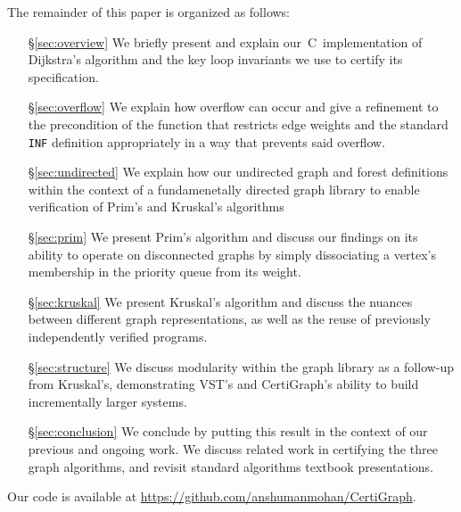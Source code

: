 The remainder of this paper is organized as follows:
\begin{itemize}
    \item[\S\ref{sec:overview}] We briefly present and explain
    our~C~implementation of Dijkstra's algorithm and the key loop invariants
    we use to certify its specification.
    \item[\S\ref{sec:overflow}] We explain how overflow can occur and give a
    refinement to the precondition of the function that restricts edge weights
    and the standard \texttt{INF} definition
    appropriately in a way that prevents said overflow.
    \item[\S\ref{sec:undirected}] We explain how our undirected graph and forest definitions within the context of a fundamenetally directed graph library to enable verification of Prim's and Kruskal's algorithms
    \item[\S\ref{sec:prim}] We present Prim's algorithm and discuss our findings on its ability to operate on disconnected graphs by simply dissociating a vertex's membership in the priority queue from its weight.
    \item[\S\ref{sec:kruskal}] We present Kruskal's algorithm and discuss the nuances between different graph representations, as well as the reuse of previously independently verified programs.
    \item[\S\ref{sec:structure}] We discuss modularity within the graph library as a follow-up from Kruskal's, demonstrating VST's and CertiGraph's ability to build incrementally larger systems.
    \item[\S\ref{sec:conclusion}] We conclude by putting this result in the context of our
    previous and ongoing work. We discuss related work in certifying the three graph algorithms, and revisit standard algorithms textbook presentations.
\end{itemize} 

\noindent Our code is available at \url{https://github.com/anshumanmohan/CertiGraph}.

